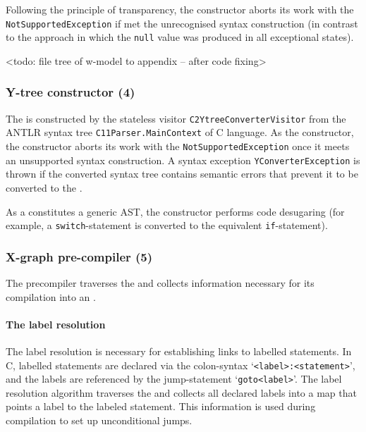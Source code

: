 Following the principle of transparency, the \wmodel{} constructor aborts its work with the \texttt{NotSupportedException} if met the unrecognised syntax construction (in contrast to the \porthos[1] approach in which the \texttt{null} value was produced in all exceptional states).

<todo: file tree of w-model to appendix -- after code fixing>


\subsubsection{Y-tree constructor (4)}
\label{ch:impl:proc:y-constr}

The \ytree{} is constructed by the stateless visitor \texttt{C2YtreeConverterVisitor} from the ANTLR syntax tree \texttt{C11Parser.MainContext} of C language.
As the \wmodel{} constructor, the \ytree{} constructor aborts its work with the \texttt{NotSupportedException} once it meets an unsupported syntax construction.
A syntax exception \texttt{YConverterException} is thrown if the converted syntax tree contains semantic errors that prevent it to be converted to the \ytree{}.

As a \ytree{} constitutes a generic AST, the \ytree{} constructor performs code desugaring (for example, a \texttt{switch}-statement is converted to the equivalent \texttt{if}-statement).


\subsubsection{X-graph pre-compiler (5)}
\label{ch:impl:proc:x-pre-compiler}

The precompiler traverses the \ytree{} and collects information necessary for its compilation into an \xgraph{}.



\paragraph{The label resolution}
\label{ch:impl:proc:x-pre-compiler:label}


The label resolution is necessary for establishing links to labelled statements. %
In C, labelled statements are declared via the colon-syntax `\texttt{<label>\;:\;<statement>}', and the labels are referenced by the jump-statement `\texttt{goto\;<label>}'.
The label resolution algorithm traverses the \ytree{} and collects all declared labels into a map that points a label to the labeled statement. %
This information is used during compilation to set up unconditional jumps.


